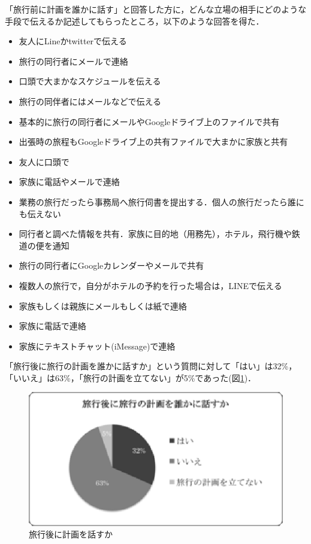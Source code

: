 \documentclass{funthesis}
\begin{document}
「旅行前に計画を誰かに話す」と回答した方に，どんな立場の相手にどのような手段で伝えるか記述してもらったところ，以下のような回答を得た．
\begin{itemize}
 \item 友人にLineかtwitterで伝える
 \item 旅行の同行者にメールで連絡
 \item 口頭で大まかなスケジュールを伝える
 \item 旅行の同伴者にはメールなどで伝える
 \item 基本的に旅行の同行者にメールやGoogleドライブ上のファイルで共有
 \item 出張時の旅程もGoogleドライブ上の共有ファイルで大まかに家族と共有
 \item 友人に口頭で
 \item 家族に電話やメールで連絡
 \item 業務の旅行だったら事務局へ旅行伺書を提出する．個人の旅行だったら誰にも伝えない
 \item 同行者と調べた情報を共有．家族に目的地（用務先），ホテル，飛行機や鉄道の便を通知
 \item 旅行の同行者にGoogleカレンダーやメールで共有
 \item 複数人の旅行で，自分がホテルの予約を行った場合は，LINEで伝える
 \item 家族もしくは親族にメールもしくは紙で連絡
 \item 家族に電話で連絡
 \item 家族にテキストチャット(iMessage)で連絡
\end{itemize}


「旅行後に旅行の計画を誰かに話すか」という質問に対して「はい」は32\%，「いいえ」は63\%，「旅行の計画を立てない」が5\%であった(図\ref{Laftertalktrip})．

\begin{figure}[htpb]
\begin{center}
\includegraphics[scale=0.65]{aftertalktrip.eps}
\end{center}
\caption{旅行後に計画を話すか}
\label{Laftertalktrip}
\end{figure}
\end{document}
